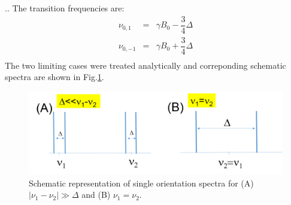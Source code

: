 \documentclass{beamer}
\begin{document}
\begin{frame}{\thesection.\thesubsection. \insertsubsection}
	The transition frequencies are:
	\begin{equation}
	   \begin{array}{lcl}
	   \nu_{0,1} &=& \gamma B_0 - \dfrac{3}{4}\Delta \\
	   \nu_{0,-1} &=& \gamma B_0 + \dfrac{3}{4}\Delta \\	   
	   \end{array}
	\end{equation}
    The two limiting cases were treated analytically and correponding schematic spectra are shown in Fig.\ref{fig:NMRdoublets}.
    \begin{figure} \label{fig:NMRdoublets}
    	\centering
    	\includegraphics[scale=0.3]{NMRdoublets.png}
    	\caption{Schematic representation of single orientation spectra for (A) $\mid \nu_1 - \nu_2 \mid  \gg \Delta$ and (B) $\nu_1 = \nu_2$.  }
    \end{figure}
\end{frame}
\end{document}
